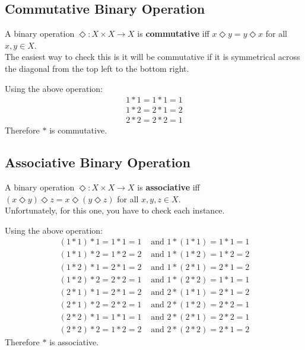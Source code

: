 \documentclass[../notes.tex]{subfiles}
\begin{document}
			\subsection{Commutative Binary Operation}
				A binary operation $\Diamond: X \times X \rightarrow X$ is \textbf{commutative} iff $x \Diamond y = y \Diamond x$ for all $x, y \in X$.\\
				The easiest way to check this is it will be commutative if it is symmetrical across the diagonal from the top left to the bottom right.
				\begin{examplebox}
					Using the above operation:
					\begin{align*}
						1 * 1 = 1 * 1 = 1\\
						1 * 2 = 2 * 1 = 2\\
						2 * 2 = 2 * 2 = 1
					\end{align*}
					Therefore $*$ is commutative.
				\end{examplebox}
			\subsection{Associative Binary Operation}
				A binary operation $\Diamond: X \times X \rightarrow X$ is \textbf{associative} iff $(x \Diamond y) \Diamond z = x \Diamond (y \Diamond z)$ for all $x, y, z \in X$.\\
				Unfortunately, for this one, you have to check each instance.
				\begin{examplebox}
					Using the above operation:
					\begin{align*}
						(1 * 1) * 1 = 1 * 1 = 1 &\text{ and } 1 * (1 * 1) = 1 * 1 = 1\\
						(1 * 1) * 2 = 1 * 2 = 2 &\text{ and } 1 * (1 * 2) = 1 * 2 = 2\\
						(1 * 2) * 1 = 2 * 1 = 2 &\text{ and } 1 * (2 * 1) = 2 * 1 = 2\\
						(1 * 2) * 2 = 2 * 2 = 1 &\text{ and } 1 * (2 * 2) = 1 * 1 = 1\\
						(2 * 1) * 1 = 2 * 1 = 2 &\text{ and } 2 * (1 * 1) = 2 * 1 = 2\\
						(2 * 1) * 2 = 2 * 2 = 1 &\text{ and } 2 * (1 * 2) = 2 * 2 = 1\\
						(2 * 2) * 1 = 1 * 1 = 1 &\text{ and } 2 * (2 * 1) = 2 * 2 = 1\\
						(2 * 2) * 2 = 1 * 2 = 2 &\text{ and } 2 * (2 * 2) = 2 * 1 = 2
					\end{align*}
					Therefore $*$ is associative.
				\end{examplebox}
			\pagebreak
\end{document}
